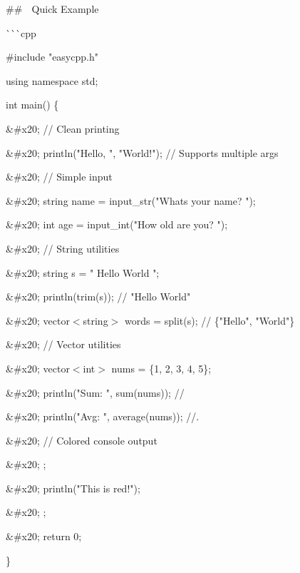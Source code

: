 \#\# 🚀 Quick Example

\`{}\`{}\`{}cpp

\#include "{}easycpp.\+h"{}

using namespace std;

int main() \{

\&\+\#x20; /\+/\+ Clean printing

\&\+\#x20; println("{}\+Hello, "{}, "{}\+World!"{}); /\+/\+ Supports multiple args

\&\+\#x20; /\+/\+ Simple input

\&\+\#x20; string name = input\+\_\+str("{}\+What\textquotesingle{}s your name? "{});

\&\+\#x20; int age = input\+\_\+int("{}\+How old are you? "{});

\&\+\#x20; /\+/\+ String utilities

\&\+\#x20; string s = "{}  Hello World  "{};

\&\+\#x20; println(trim(s)); /\+/\+ "{}\+Hello World"{}

\&\+\#x20; vector$<$string$>$ words = split(s); /\+/\+ \{"{}\+Hello"{}, "{}\+World"{}\}

\&\+\#x20; /\+/\+ Vector utilities

\&\+\#x20; vector$<$int$>$ nums = \{1, 2, 3, 4, 5\};

\&\+\#x20; println("{}\+Sum:\+ "{}, sum(nums)); /\+/

\&\+\#x20; println("{}\+Avg:\+ "{}, average(nums)); /\+/.

\&\+\#x20; /\+/\+ Colored console output

\&\+\#x20; ;

\&\+\#x20; println("{}\+This is red!"{});

\&\+\#x20; ;

\&\+\#x20; return 0;

\} 